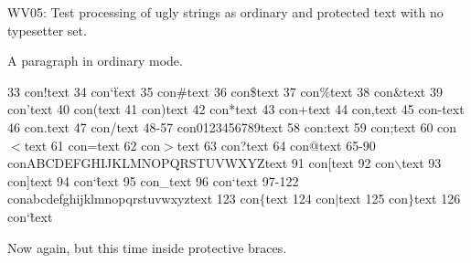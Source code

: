 \def\p#1{{\tt #1}}  %
\def\flagpage#1#2{
   \null
   \vfill
   \centerline{\fwfontboldd #1}
   \vskip 1cm
   \centerline{\fwfontboldd #2}
   \vfill
   \null
   \vfill
}

WV05: Test processing of ugly strings as ordinary and protected text
with no typesetter set.

\fwbeginmacro
{}\fwequals \fwodef \fwcdef 
\fwbeginmacronotes
{}
\fwendmacronotes
\fwendmacro


A paragraph in ordinary mode.

33 con!text
34 con\char`\"text
35 con\#text
36 con\$text
37 con\%text
38 con\&text
39 con'text
40 con(text
41 con)text
42 con*text
43 con+text
44 con,text
45 con-text
46 con.text
47 con/text
48-57 con0123456789text
58 con:text
59 con;text
60 con$<$text
61 con=text
62 con$>$text
63 con?text
64 con@text
65-90 conABCDEFGHIJKLMNOPQRSTUVWXYZtext
91 con[text
92 con$\backslash$text
93 con]text
94 con\char`\^text
95 con\_text
96 con`text
97-122 conabcdefghijklmnopqrstuvwxyztext
123 con$\{$text
124 con$|$text
125 con$\}$text
126 con\char`\~text

Now again, but this time inside protective braces.

\bye



